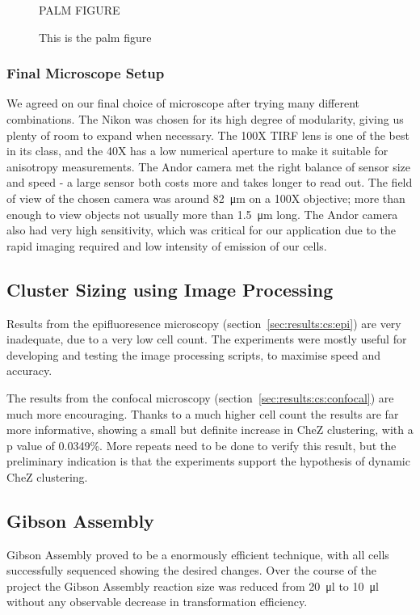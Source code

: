 \documentclass[../main.tex]{subfiles}
\begin{document}
\begin{figure}[h!]
PALM FIGURE
\caption{This is the palm figure}
\end{figure}

\subsubsection{Final Microscope Setup}

We agreed on our final choice of microscope after trying many different combinations. The Nikon was chosen for its high degree of modularity, giving us plenty of room to expand when necessary. The 100X TIRF lens is one of the best in its class, and the 40X has a low numerical aperture to make it suitable for anisotropy measurements\citep{lakowicz}. The Andor camera met the right balance of sensor size and speed - a large sensor both costs more and takes longer to read out. The field of view of the chosen camera was around \SI{82}{\micro\meter} on a 100X objective; more than enough to view objects not usually more than \SI{1.5}{\micro\meter} long. The Andor camera also had very high sensitivity, which was critical for our application due to the rapid imaging required and low intensity of emission of our cells.

\subsection{Cluster Sizing using Image Processing}

Results from the epifluoresence microscopy (section~\ref{sec:results:cs:epi}) are very inadequate, due to a very low cell count. The experiments were mostly useful for developing and testing the image processing scripts, to maximise speed and accuracy.

The results from the confocal microscopy (section~\ref{sec:results:cs:confocal}) are much more encouraging. Thanks to a much higher cell count the results are far more informative, showing a small but definite increase in CheZ clustering, with a p value of 0.0349\%. More repeats need to be done to verify this result, but the preliminary indication is that the experiments support the hypothesis of dynamic CheZ clustering.

\subsection{Gibson Assembly}
Gibson Assembly proved to be a enormously efficient technique, with all cells successfully sequenced showing the desired changes. Over the course of the project the Gibson Assembly reaction size was reduced from \SI{20}{\micro\litre} to \SI{10}{\micro\litre} without any observable decrease in transformation efficiency. 
\end{document}
